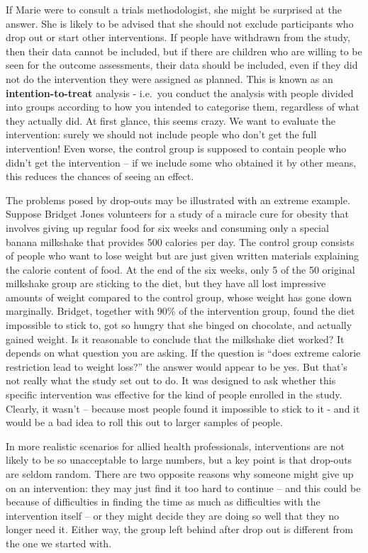 \documentclass{krantz}
\begin{document}
If Marie were to consult a trials methodologist, she might be surprised at the answer. She is likely to be advised that she should not exclude participants who drop out or start other interventions. If people have withdrawn from the study, then their data cannot be included, but if there are children who are willing to be seen for the outcome assessments, their data should be included, even if they did not do the intervention they were assigned as planned. This is known as an \textbf{intention-to-treat} analysis - i.e.~you conduct the analysis with people divided into groups according to how you intended to categorise them, regardless of what they actually did. At first glance, this seems crazy. We want to evaluate the intervention: surely we should not include people who don't get the full intervention! Even worse, the control group is supposed to contain people who didn't get the intervention -- if we include some who obtained it by other means, this reduces the chances of seeing an effect.

The problems posed by drop-outs may be illustrated with an extreme example. Suppose Bridget Jones volunteers for a study of a miracle cure for obesity that involves giving up regular food for six weeks and consuming only a special banana milkshake that provides 500 calories per day. The control group consists of people who want to lose weight but are just given written materials explaining the calorie content of food. At the end of the six weeks, only 5 of the 50 original milkshake group are sticking to the diet, but they have all lost impressive amounts of weight compared to the control group, whose weight has gone down marginally. Bridget, together with 90\% of the intervention group, found the diet impossible to stick to, got so hungry that she binged on chocolate, and actually gained weight. Is it reasonable to conclude that the milkshake diet worked? It depends on what question you are asking. If the question is ``does extreme calorie restriction lead to weight loss?'' the answer would appear to be yes. But that's not really what the study set out to do. It was designed to ask whether this specific intervention was effective for the kind of people enrolled in the study. Clearly, it wasn't -- because most people found it impossible to stick to it - and it would be a bad idea to roll this out to larger samples of people.

In more realistic scenarios for allied health professionals, interventions are not likely to be so unacceptable to large numbers, but a key point is that drop-outs are seldom random. There are two opposite reasons why someone might give up on an intervention: they may just find it too hard to continue -- and this could be because of difficulties in finding the time as much as difficulties with the intervention itself -- or they might decide they are doing so well that they no longer need it. Either way, the group left behind after drop out is different from the one we started with.
\end{document}
